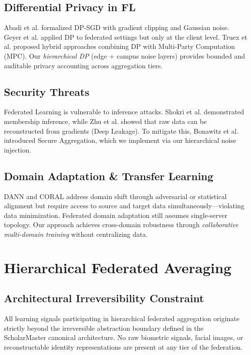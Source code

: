 \documentclass[conference]{IEEEtran}
\begin{document}
\subsection{Differential Privacy in FL}

Abadi et al. formalized DP-SGD with gradient clipping and Gaussian noise. Geyer et al. applied DP to federated settings but only at the client level. Truex et al. proposed hybrid approaches combining DP with Multi-Party Computation (MPC). Our \textit{hierarchical DP} (edge + campus noise layers) provides bounded and auditable privacy accounting across aggregation tiers.

\subsection{Security Threats}
Federated Learning is vulnerable to inference attacks. Shokri et al. demonstrated membership inference, while Zhu et al. showed that raw data can be reconstructed from gradients (Deep Leakage). To mitigate this, Bonawitz et al. introduced Secure Aggregation, which we implement via our hierarchical noise injection.

\subsection{Domain Adaptation \& Transfer Learning}

DANN and CORAL address domain shift through adversarial or statistical alignment but require access to source and target data simultaneously---violating data minimization. Federated domain adaptation still assumes single-server topology. Our approach achieves cross-domain robustness through \textit{collaborative multi-domain training} without centralizing data.

\section{Hierarchical Federated Averaging}

\subsection{Architectural Irreversibility Constraint}

All learning signals participating in hierarchical federated aggregation originate strictly beyond the irreversible abstraction boundary defined in the ScholarMaster canonical architecture. No raw biometric signals, facial images, or reconstructable identity representations are present at any tier of the federation.
\end{document}
